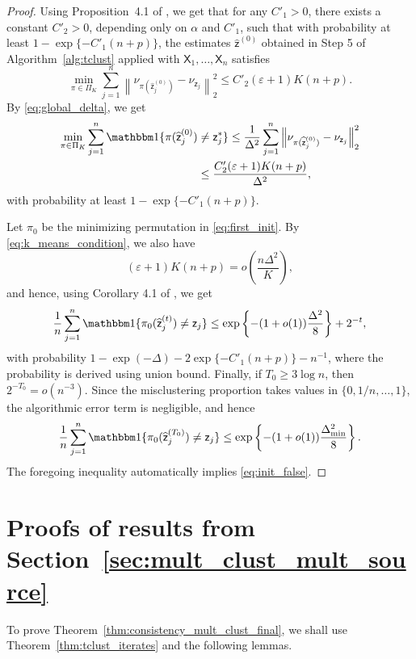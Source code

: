 \documentclass[10pt]{article}
\newcommand{\wh}{\widehat}
\begin{document}
\begin{proof}
Using Proposition~4.1 of \citet{gao2022iterative}, we get that for any $C'_1>0$, there exists a constant
$C'_2>0$, depending only on $\alpha$ and $C'_1$, such that with probability
at least $1-\exp\{-C'_1(n+p)\}$, the estimates $\wh{\mathsf{z}}^{(0)}$ obtained in Step 5 of Algorithm~\ref{alg:tclust} applied with $\mathsf{X}_1,\ldots,\mathsf{X}_n$ satisfies
\[
\min_{\pi\in\Pi_K}\sum_{j=1}^n\left\|
\nu_{\pi(\widehat{\mathsf z}_j^{(0)})}
-\nu_{\mathsf z_j}\right\|_2^2\le C'_2(\varepsilon+1)K(n+p).
\]
By \eqref{eq:global_delta}, we get
\begin{align}
\label{eq:first_init}
\min_{\pi\in\Pi_K}\sum_{j=1}^n\mathbbm 1\{\pi(\widehat{\mathsf z}_j^{(0)})& \neq \mathsf z_j^*\}\le \frac{1}{\Delta^2}\sum_{j=1}^n\left\|
\nu_{\pi(\widehat{\mathsf z}_j^{(0)})}
-\nu_{\mathsf z_j}\right\|_2^2\\
& \le \frac{C'_2(\varepsilon+1)K(n+p)}{\Delta^2},
\end{align}
with probability
at least $1-\exp\{-C'_1(n+p)\}$.

Let $\pi_0$ be the minimizing permutation in \eqref{eq:first_init}. By \eqref{eq:k_means_condition}, we also have
\[
(\varepsilon+1)K(n+p)=o\left(\frac{n\Delta^2}{K}\right),
\]
and hence, using Corollary 4.1 of \cite{gao2022iterative}, we get
\[
\frac{1}{n}\sum_{j=1}^n\mathbbm 1\{\pi_0(\widehat{\mathsf z}_j^{(t)})\neq\mathsf z_j\}
\le\exp\left\{-(1+o(1))\frac{\Delta^2}{8}\right\}+2^{-t},
\]
with probability $1-\exp(-\Delta)-2\exp\{-C'_1(n+p)\}-n^{-1}$, where the probability is derived using union bound.
Finally, if $T_0\ge 3\log n$, then $2^{-T_0}=o(n^{-3})$. Since the
misclustering proportion takes values in \(\{0,1/n,\ldots,1\}\), the
algorithmic error term is negligible, and hence
\[
\frac{1}{n}\sum_{j=1}^n\mathbbm 1\{\pi_0(\widehat{\mathsf z}_j^{(T_0)})\neq\mathsf z_j\}
\le\exp\left\{-(1+o(1))\frac{\Delta_{\min}^2}{8}\right\}.
\]
The foregoing inequality automatically implies \eqref{eq:init_false}.
\end{proof}

\section{Proofs of results from Section~\ref{sec:mult_clust_mult_source}}
To prove Theorem~\ref{thm:consistency_mult_clust_final}, we shall use Theorem~\ref{thm:tclust_iterates} and the following lemmas.
\end{document}
